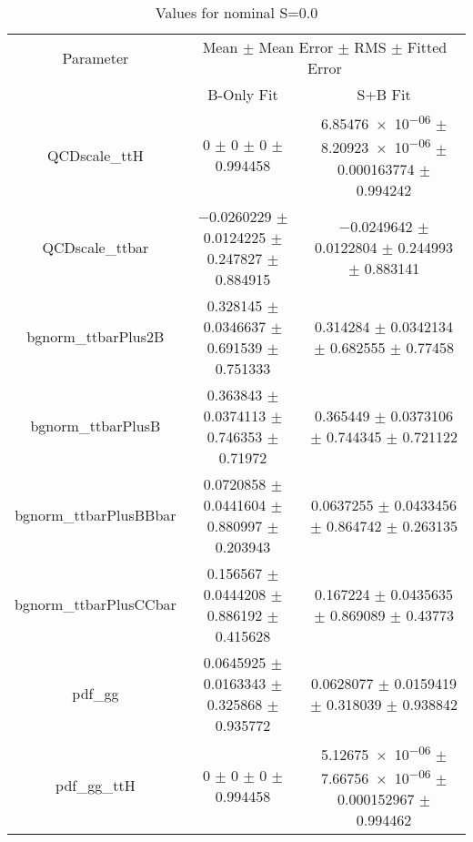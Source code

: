 \begin{table}
\centering
\caption{Values for nominal S=0.0}
\begin{tabular}{ccc}
\toprule
Parameter & \multicolumn{2}{c}{Mean $\pm$ Mean Error $\pm$ RMS $\pm$ Fitted Error}\\
 & B-Only Fit & S+B Fit\\
\midrule
QCDscale\_ttH & \num{0} $\pm$ \num{0} $\pm$ \num{0} $\pm$ \num{0.994458} & \num{6.85476e-06} $\pm$ \num{8.20923e-06} $\pm$ \num{0.000163774} $\pm$ \num{0.994242}\\
QCDscale\_ttbar & \num{-0.0260229} $\pm$ \num{0.0124225} $\pm$ \num{0.247827} $\pm$ \num{0.884915} & \num{-0.0249642} $\pm$ \num{0.0122804} $\pm$ \num{0.244993} $\pm$ \num{0.883141}\\
bgnorm\_ttbarPlus2B & \num{0.328145} $\pm$ \num{0.0346637} $\pm$ \num{0.691539} $\pm$ \num{0.751333} & \num{0.314284} $\pm$ \num{0.0342134} $\pm$ \num{0.682555} $\pm$ \num{0.77458}\\
bgnorm\_ttbarPlusB & \num{0.363843} $\pm$ \num{0.0374113} $\pm$ \num{0.746353} $\pm$ \num{0.71972} & \num{0.365449} $\pm$ \num{0.0373106} $\pm$ \num{0.744345} $\pm$ \num{0.721122}\\
bgnorm\_ttbarPlusBBbar & \num{0.0720858} $\pm$ \num{0.0441604} $\pm$ \num{0.880997} $\pm$ \num{0.203943} & \num{0.0637255} $\pm$ \num{0.0433456} $\pm$ \num{0.864742} $\pm$ \num{0.263135}\\
bgnorm\_ttbarPlusCCbar & \num{0.156567} $\pm$ \num{0.0444208} $\pm$ \num{0.886192} $\pm$ \num{0.415628} & \num{0.167224} $\pm$ \num{0.0435635} $\pm$ \num{0.869089} $\pm$ \num{0.43773}\\
pdf\_gg & \num{0.0645925} $\pm$ \num{0.0163343} $\pm$ \num{0.325868} $\pm$ \num{0.935772} & \num{0.0628077} $\pm$ \num{0.0159419} $\pm$ \num{0.318039} $\pm$ \num{0.938842}\\
pdf\_gg\_ttH & \num{0} $\pm$ \num{0} $\pm$ \num{0} $\pm$ \num{0.994458} & \num{5.12675e-06} $\pm$ \num{7.66756e-06} $\pm$ \num{0.000152967} $\pm$ \num{0.994462}\\
\bottomrule
\end{tabular}
\end{table}